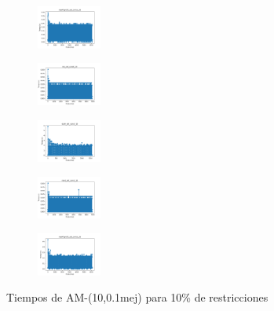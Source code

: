 \begin{figure}[H]
\begin{subfigure}
        \centering
        \includegraphics[width=0.234\textwidth]{img/am01mej/newthyroid_set_const_10_49258669_time.png}
    \end{subfigure}
    \hfill
    \begin{subfigure}
        \centering
        \includegraphics[width=0.234\textwidth]{img/am01mej/iris_set_const_10_3773969821_time.png}
    \end{subfigure}
    \hfill
    \begin{subfigure}
        \centering
        \includegraphics[width=0.234\textwidth]{img/am01mej/ecoli_set_const_10_3773969821_time.png}
    \end{subfigure}
    \hfill
    \begin{subfigure}
        \centering
        \includegraphics[width=0.234\textwidth]{img/am01mej/rand_set_const_10_3773969821_time.png}
    \end{subfigure}
    \hfill
    \begin{subfigure}
        \centering
        \includegraphics[width=0.234\textwidth]{img/am01mej/newthyroid_set_const_10_3773969821_time.png}
    \end{subfigure}
    \caption{Tiempos de AM-(10,0.1mej) para 10\% de restricciones}
\end{figure}


